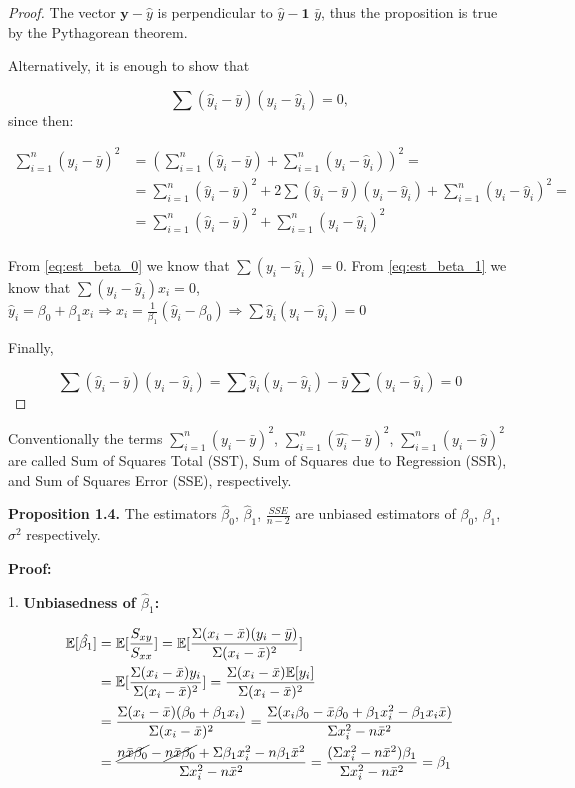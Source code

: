 \documentclass[12pt,a4paper,oneside]{book} %
\begin{document}
\begin{proof}The vector $\textbf{y} - \textbf{$\hat{y}$}$ is perpendicular to $\textbf{$\hat{y}$} - \textbf{1 $\bar{y}$}$, thus the proposition is true by the Pythagorean theorem.

Alternatively, it is enough to show that

\[
	\sum (\hat{y}_i-\bar{y})(y_i-\hat{y}_i) = 0	,
\] since then:

\begin{align*}
	\sum_{i=1}^{n} (y_i - \bar{y})^2 &= (\sum_{i=1}^{n} (\hat{y}_i - \bar{y}) + \sum_{i=1}^{n} (y_i - \hat{y}_i))^2 = \\
	&= \sum_{i=1}^{n} (\hat{y}_i - \bar{y})^2 + 2\sum (\hat{y}_i-\bar{y})(y_i-\hat{y}_i)+ \sum_{i=1}^{n} (y_i - \hat{y}_i)^2 = \\
	&= \sum_{i=1}^{n} (\hat{y}_i - \bar{y})^2 + \sum_{i=1}^{n} (y_i - \hat{y}_i)^2 \\
\end{align*}

From \ref{eq:est_beta_0} we know that $\sum (y_i-\hat{y}_i)=0$.
From \ref{eq:est_beta_1} we know that $\sum (y_i-\hat{y}_i)x_i=0$,
$\hat{y}_i = \beta_0 + \beta_1 x_i \Rightarrow x_i = \frac{1}{\beta_1}(\hat{y}_i-\beta_0) \Rightarrow \sum \hat{y}_i (y_i-\hat{y}_i)=0$

Finally, 

\[
	\sum (\hat{y}_i-\bar{y})(y_i-\hat{y}_i) = \sum \hat{y}_i(y_i-\hat{y}_i)-\bar{y}\sum (y_i-\hat{y}_i)=0	
\]


\end{proof}

Conventionally the terms $\sum_{i=1}^{n} (y_i - \bar{y})^2$, $\sum_{i=1}^{n} (\hat{y_i} - \bar{y})^2$, $\sum_{i=1}^{n} (y_i - \hat{y})^2$ are called Sum of Squares Total (SST),
 Sum of Squares due to Regression (SSR), and Sum of Squares Error (SSE), respectively.


\textbf{Proposition 1.4.} The estimators $\hat{\beta}_0$, $\hat{\beta}_1$, $\frac{SSE}{n-2}$ are unbiased estimators of $\beta_0$, $\beta_1$, $\sigma^2$ respectively.



\textbf{Proof:}

1. \textbf{Unbiasedness of $\hat{\beta}_1$:}


\begin{align*}
	\mathbb{E} [ \hat{\beta _1} ] &= \mathbb{E} [\frac{S_{xy}}{S_{xx}}] = \mathbb{E} [\frac{\Sigma (x_i - \bar{x})(y_i-\bar{y})}{\Sigma (x_i-\bar{x})^2}] \\
		&= \mathbb{E} [\frac{\Sigma (x_i - \bar{x})y_i}{\Sigma (x_i-\bar{x})^2}]=
	\frac{\Sigma (x_i - \bar{x})\mathbb{E} [y_i]}{\Sigma (x_i-\bar{x})^2}\\
		&= \frac{\Sigma (x_i - \bar{x})(\beta_0+\beta_1x_i)}{\Sigma (x_i-\bar{x})^2}=	
	\frac{\Sigma (x_i \beta_0 - \bar{x}\beta_0+\beta_1x_i^2-\beta_1x_i\bar{x})}{\Sigma x_i^2-n\bar{x}^2}\\
		&= \frac{\cancel{n\bar{x}\beta_0}-\cancel{n\bar{x}\beta_0}+\Sigma\beta_1x_i^2-n\beta_1\bar{x}^2}{\Sigma x_i^2-n\bar{x}^2}= \frac{(\Sigma x_i^2-n\bar{x}^2)\beta_1}{\Sigma x_i^2-n\bar{x}^2} = \beta_1 
\end{align*}
\end{document}
